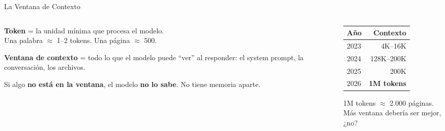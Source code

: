 \documentclass[aspectratio=169, 12pt]{beamer}
\begin{document}
\begin{frame}{La Ventana de Contexto}

\begin{columns}[T]
\begin{column}{0.55\textwidth}
\textbf{Token} = la unidad m\'inima que procesa el modelo.\\
Una palabra $\approx$ 1--2 tokens. Una p\'agina $\approx$ 500.

\vspace{1em}

\textbf{Ventana de contexto} = todo lo que el modelo puede ``ver'' al responder: el system prompt, la conversaci\'on, los archivos.

\vspace{1em}

Si algo \textbf{no est\'a en la ventana}, el modelo \textbf{no lo sabe}. No tiene memoria aparte.
\end{column}

\begin{column}{0.42\textwidth}
\renewcommand{\arraystretch}{1.3}
\begin{tabular}{@{} l r @{}}
\toprule
\textbf{A\~no} & \textbf{Contexto} \\
\midrule
2023 & 4K--16K \\
2024 & 128K--200K \\
2025 & 200K \\
2026 & \alert{\textbf{1M tokens}} \\
\bottomrule
\end{tabular}

\vspace{0.8em}
\footnotesize
1M tokens $\approx$ 2.000 p\'aginas.\\[0.3em]
M\'as ventana deber\'ia ser mejor, ¿no?
\end{column}
\end{columns}

\end{frame}
\end{document}
